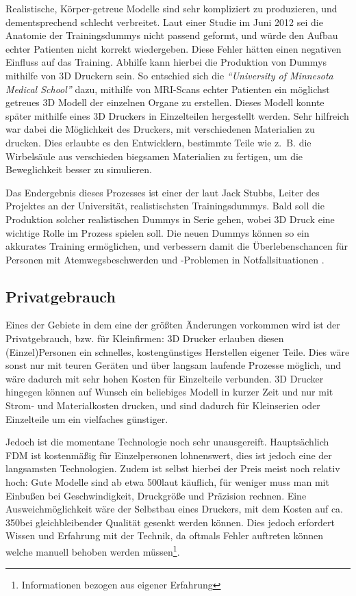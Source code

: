 Realistische, Körper-getreue Modelle sind sehr kompliziert zu produzieren, und dementsprechend schlecht verbreitet. Laut einer Studie im Juni 2012 sei die Anatomie der Trainingsdummys nicht passend geformt, und würde den Aufbau echter Patienten nicht korrekt wiedergeben. Diese Fehler hätten einen negativen Einfluss auf das Training. Abhilfe kann hierbei die Produktion von Dummys mithilfe von 3D Druckern sein. So entschied sich die \emph{\textquotedblleft University of Minnesota Medical School\textquotedblright} dazu, mithilfe von MRI-Scans echter Patienten ein möglichst getreues 3D Modell der einzelnen Organe zu erstellen. Dieses Modell konnte später mithilfe eines 3D Druckers in Einzelteilen hergestellt werden. Sehr hilfreich war dabei die Möglichkeit des Druckers, mit verschiedenen Materialien zu drucken. Dies erlaubte es den Entwicklern, bestimmte Teile wie z.~B. die Wirbelsäule aus verschieden biegsamen Materialien zu fertigen, um die Beweglichkeit besser zu simulieren. 

Das Endergebnis dieses Prozesses ist einer der laut Jack Stubbs, Leiter des Projektes an der Universität, realistischsten Trainingsdummys. Bald soll die Produktion solcher realistischen Dummys in Serie gehen, wobei 3D Druck eine wichtige Rolle im Prozess spielen soll. Die neuen Dummys können so ein akkurates Training ermöglichen, und verbessern damit die Überlebenschancen für Personen mit Atemwegsbeschwerden und -Problemen in Notfallsituationen \parencite{DUMMY_STUDY}.


\subsection{Privatgebrauch}

Eines der Gebiete in dem eine der größten Änderungen vorkommen wird ist der Privatgebrauch, bzw. für Kleinfirmen:
3D Drucker erlauben diesen (Einzel)Personen ein schnelles, kostengünstiges Herstellen eigener Teile. Dies wäre sonst nur mit teuren Geräten und über langsam laufende Prozesse möglich, und wäre dadurch mit sehr hohen Kosten für Einzelteile verbunden. 3D Drucker hingegen können auf Wunsch ein beliebiges Modell in kurzer Zeit und nur mit Strom- und Materialkosten drucken, und sind dadurch für Kleinserien oder Einzelteile um ein vielfaches günstiger. 

Jedoch ist die momentane Technologie noch sehr unausgereift. Hauptsächlich FDM ist kostenmäßig für Einzelpersonen lohnenswert, dies ist jedoch eine der langsamsten Technologien. Zudem ist selbst hierbei der Preis meist noch relativ hoch: Gute Modelle sind ab etwa 500\EURO laut \textcite{TOM_PRINTER} käuflich, für weniger muss man mit Einbußen bei Geschwindigkeit, Druckgröße und Präzision rechnen. Eine Ausweichmöglichkeit wäre der Selbstbau eines Druckers, mit dem Kosten auf ca. 350\EURO bei gleichbleibender Qualität gesenkt werden können. Dies jedoch erfordert Wissen und Erfahrung mit der Technik, da oftmals Fehler auftreten können welche manuell behoben werden müssen\footnote{Informationen bezogen aus eigener Erfahrung}.

